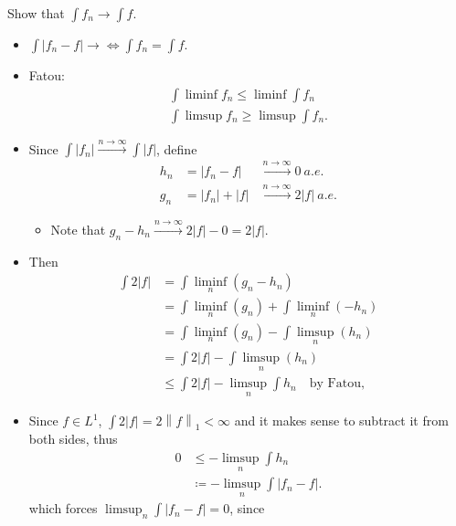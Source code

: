 Show that \(\int f_{n} \rightarrow \int f\).

\begin{solution}

\hfill

\begin{concept}

\hfill

\begin{itemize}
\tightlist
\item
  \(\int {\left\lvert {f_n - f} \right\rvert} \to \iff \int f_n = \int f\).
\item
  Fatou:
  \begin{align*}
  \int \liminf f_n \leq \liminf \int f_n \\
  \int \limsup f_n \geq \limsup \int f_n
  .\end{align*}
\end{itemize}

\end{concept}

\begin{itemize}
\item
  Since
  \(\int {\left\lvert {f_n} \right\rvert} \overset{n\to\infty}\to \int {\left\lvert {f} \right\rvert}\),
  define
  \begin{align*}
  h_n &= {\left\lvert {f_n - f} \right\rvert} &\overset{n\to\infty}\to 0 ~a.e.\\
  g_n &= {\left\lvert {f_n} \right\rvert} + {\left\lvert {f} \right\rvert} &\overset{n\to\infty}\to 2{\left\lvert {f} \right\rvert} ~a.e.
  \end{align*}

  \begin{itemize}
  \tightlist
  \item
    Note that
    \(g_n - h_n \overset{n\to\infty}\to 2{\left\lvert {f} \right\rvert} - 0 = 2{\left\lvert {f} \right\rvert}\).
  \end{itemize}
\item
  Then
  \begin{align*}
  \int 2 {\left\lvert {f} \right\rvert} 
  &= \int \liminf_n (g_n - h_n) \\
  &= \int \liminf_n(g_n) + \int \liminf_n(-h_n) \\
  &= \int \liminf_n(g_n) - \int \limsup_n(h_n) \\
  &= \int 2 {\left\lvert {f} \right\rvert} - \int \limsup_n(h_n) \\
  &\leq \int 2{\left\lvert {f} \right\rvert} - \limsup_n \int h_n \quad\text{by Fatou}
  ,\end{align*}
\item
  Since \(f\in L^1\),
  \(\int 2{\left\lvert {f} \right\rvert} = 2{\left\lVert {f} \right\rVert}_1 < \infty\)
  and it makes sense to subtract it from both sides, thus
  \begin{align*}
  0 &\leq - \limsup_n \int h_n \\
  &\coloneqq- \limsup_n \int {\left\lvert {f_n - f} \right\rvert}
  .\end{align*}
  which forces
  \(\limsup_n \int {\left\lvert {f_n -f} \right\rvert} = 0\), since


\end{itemize}
\end{solution}
